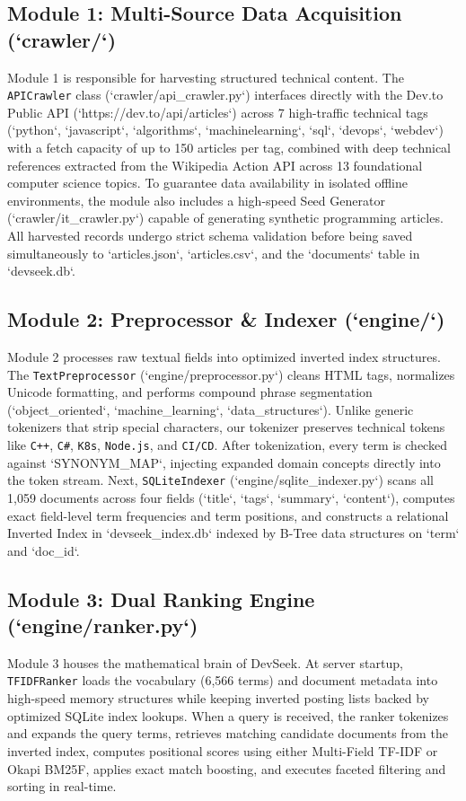 \documentclass[12pt,a4paper]{article}
\begin{document}
\subsection{Module 1: Multi-Source Data Acquisition (`crawler/`)}
Module 1 is responsible for harvesting structured technical content. The \texttt{APICrawler} class (`crawler/api\_crawler.py`) interfaces directly with the Dev.to Public API (`https://dev.to/api/articles`) across 7 high-traffic technical tags (`python`, `javascript`, `algorithms`, `machinelearning`, `sql`, `devops`, `webdev`) with a fetch capacity of up to 150 articles per tag, combined with deep technical references extracted from the Wikipedia Action API across 13 foundational computer science topics. To guarantee data availability in isolated offline environments, the module also includes a high-speed Seed Generator (`crawler/it\_crawler.py`) capable of generating synthetic programming articles. All harvested records undergo strict schema validation before being saved simultaneously to `articles.json`, `articles.csv`, and the `documents` table in `devseek.db`.

\subsection{Module 2: Preprocessor \& Indexer (`engine/`)}
Module 2 processes raw textual fields into optimized inverted index structures. The \texttt{TextPreprocessor} (`engine/preprocessor.py`) cleans HTML tags, normalizes Unicode formatting, and performs compound phrase segmentation (`object\_oriented`, `machine\_learning`, `data\_structures`). Unlike generic tokenizers that strip special characters, our tokenizer preserves technical tokens like \texttt{C++}, \texttt{C\#}, \texttt{K8s}, \texttt{Node.js}, and \texttt{CI/CD}. After tokenization, every term is checked against `SYNONYM\_MAP`, injecting expanded domain concepts directly into the token stream. Next, \texttt{SQLiteIndexer} (`engine/sqlite\_indexer.py`) scans all 1,059 documents across four fields (`title`, `tags`, `summary`, `content`), computes exact field-level term frequencies and term positions, and constructs a relational Inverted Index in `devseek\_index.db` indexed by B-Tree data structures on `term` and `doc\_id`.

\subsection{Module 3: Dual Ranking Engine (`engine/ranker.py`)}
Module 3 houses the mathematical brain of DevSeek. At server startup, \texttt{TFIDFRanker} loads the vocabulary (6,566 terms) and document metadata into high-speed memory structures while keeping inverted posting lists backed by optimized SQLite index lookups. When a query is received, the ranker tokenizes and expands the query terms, retrieves matching candidate documents from the inverted index, computes positional scores using either Multi-Field TF-IDF or Okapi BM25F, applies exact match boosting, and executes faceted filtering and sorting in real-time.
\end{document}
